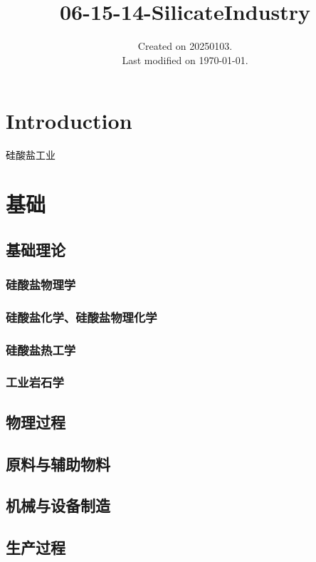 \documentclass[UTF8]{../../ApplicationUniverse}
\begin{document}
\title{06-15-14-SilicateIndustry}
\date{Created on 20250103.\\   Last modified on \today.}
\maketitle
\tableofcontents


\chapter{Introduction}

 

硅酸盐工业%



\chapter{基础}
\section{基础理论}
    \subsection{硅酸盐物理学}
    \subsection{硅酸盐化学、硅酸盐物理化学}
    \subsection{硅酸盐热工学}
    \subsection{工业岩石学}
\section{物理过程}
\section{原料与辅助物料}
\section{机械与设备制造}
\section{生产过程}
\end{document}
